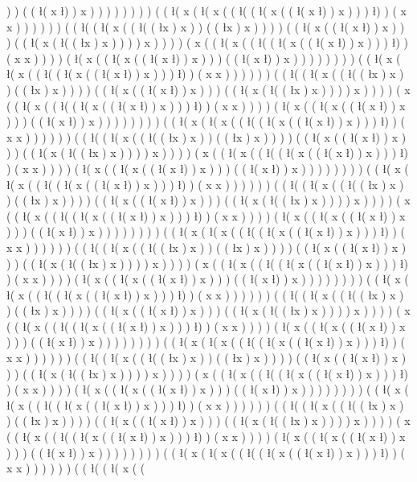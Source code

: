) ) ( ( \l ( x \l ) ) x ) ) ) ) ) ) ) ) ( ( \l ( x ( \l ( x ( ( \l ( ( \l ( x ( ( \l ( x \l ) ) x ) ) ) \l ) ) ( x x ) ) ) ) ) ) ( ( \l ( ( \l ( x ( ( \l ( ( \l x ) x ) ) ( ( \l x ) x ) ) ) ) ( ( \l ( x ( ( \l ( x \l ) ) x ) ) ) ( ( \l ( x ( \l ( ( \l x ) x ) ) ) ) x ) ) ) ) ( x ( ( \l ( x ( ( \l ( ( \l ( x ( ( \l ( x \l ) ) x ) ) ) \l ) ) ( x x ) ) ) ) ( \l ( x ( ( \l ( x ( ( \l ( x \l ) ) x ) ) ) ( ( \l ( x \l ) ) x ) ) ) ) ) ) ) ) ( ( \l ( x ( \l ( x ( ( \l ( ( \l ( x ( ( \l ( x \l ) ) x ) ) ) \l ) ) ( x x ) ) ) ) ) ) ( ( \l ( ( \l ( x ( ( \l ( ( \l x ) x ) ) ( ( \l x ) x ) ) ) ) ( ( \l ( x ( ( \l ( x \l ) ) x ) ) ) ( ( \l ( x ( \l ( ( \l x ) x ) ) ) ) x ) ) ) ) ( x ( ( \l ( x ( ( \l ( ( \l ( x ( ( \l ( x \l ) ) x ) ) ) \l ) ) ( x x ) ) ) ) ( \l ( x ( ( \l ( x ( ( \l ( x \l ) ) x ) ) ) ( ( \l ( x \l ) ) x ) ) ) ) ) ) ) ) ( ( \l ( x ( \l ( x ( ( \l ( ( \l ( x ( ( \l ( x \l ) ) x ) ) ) \l ) ) ( x x ) ) ) ) ) ) ( ( \l ( ( \l ( x ( ( \l ( ( \l x ) x ) ) ( ( \l x ) x ) ) ) ) ( ( \l ( x ( ( \l ( x \l ) ) x ) ) ) ( ( \l ( x ( \l ( ( \l x ) x ) ) ) ) x ) ) ) ) ( x ( ( \l ( x ( ( \l ( ( \l ( x ( ( \l ( x \l ) ) x ) ) ) \l ) ) ( x x ) ) ) ) ( \l ( x ( ( \l ( x ( ( \l ( x \l ) ) x ) ) ) ( ( \l ( x \l ) ) x ) ) ) ) ) ) ) ) ( ( \l ( x ( \l ( x ( ( \l ( ( \l ( x ( ( \l ( x \l ) ) x ) ) ) \l ) ) ( x x ) ) ) ) ) ) ( ( \l ( ( \l ( x ( ( \l ( ( \l x ) x ) ) ( ( \l x ) x ) ) ) ) ( ( \l ( x ( ( \l ( x \l ) ) x ) ) ) ( ( \l ( x ( \l ( ( \l x ) x ) ) ) ) x ) ) ) ) ( x ( ( \l ( x ( ( \l ( ( \l ( x ( ( \l ( x \l ) ) x ) ) ) \l ) ) ( x x ) ) ) ) ( \l ( x ( ( \l ( x ( ( \l ( x \l ) ) x ) ) ) ( ( \l ( x \l ) ) x ) ) ) ) ) ) ) ) ( ( \l ( x ( \l ( x ( ( \l ( ( \l ( x ( ( \l ( x \l ) ) x ) ) ) \l ) ) ( x x ) ) ) ) ) ) ( ( \l ( ( \l ( x ( ( \l ( ( \l x ) x ) ) ( ( \l x ) x ) ) ) ) ( ( \l ( x ( ( \l ( x \l ) ) x ) ) ) ( ( \l ( x ( \l ( ( \l x ) x ) ) ) ) x ) ) ) ) ( x ( ( \l ( x ( ( \l ( ( \l ( x ( ( \l ( x \l ) ) x ) ) ) \l ) ) ( x x ) ) ) ) ( \l ( x ( ( \l ( x ( ( \l ( x \l ) ) x ) ) ) ( ( \l ( x \l ) ) x ) ) ) ) ) ) ) ) ( ( \l ( x ( \l ( x ( ( \l ( ( \l ( x ( ( \l ( x \l ) ) x ) ) ) \l ) ) ( x x ) ) ) ) ) ) ( ( \l ( ( \l ( x ( ( \l ( ( \l x ) x ) ) ( ( \l x ) x ) ) ) ) ( ( \l ( x ( ( \l ( x \l ) ) x ) ) ) ( ( \l ( x ( \l ( ( \l x ) x ) ) ) ) x ) ) ) ) ( x ( ( \l ( x ( ( \l ( ( \l ( x ( ( \l ( x \l ) ) x ) ) ) \l ) ) ( x x ) ) ) ) ( \l ( x ( ( \l ( x ( ( \l ( x \l ) ) x ) ) ) ( ( \l ( x \l ) ) x ) ) ) ) ) ) ) ) ( ( \l ( x ( \l ( x ( ( \l ( ( \l ( x ( ( \l ( x \l ) ) x ) ) ) \l ) ) ( x x ) ) ) ) ) ) ( ( \l ( ( \l ( x ( ( \l ( ( \l x ) x ) ) ( ( \l x ) x ) ) ) ) ( ( \l ( x ( ( \l ( x \l ) ) x ) ) ) ( ( \l ( x ( \l ( ( \l x ) x ) ) ) ) x ) ) ) ) ( x ( ( \l ( x ( ( \l ( ( \l ( x ( ( \l ( x \l ) ) x ) ) ) \l ) ) ( x x ) ) ) ) ( \l ( x ( ( \l ( x ( ( \l ( x \l ) ) x ) ) ) ( ( \l ( x \l ) ) x ) ) ) ) ) ) ) ) ( ( \l ( x ( \l ( x ( ( \l ( ( \l ( x ( ( \l ( x \l ) ) x ) ) ) \l ) ) ( x x ) ) ) ) ) ) ( ( \l ( ( \l ( x ( ( \l ( ( \l x ) x ) ) ( ( \l x ) x ) ) ) ) ( ( \l ( x ( ( \l ( x \l ) ) x ) ) ) ( ( \l ( x ( \l ( ( \l x ) x ) ) ) ) x ) ) ) ) ( x ( ( \l ( x ( ( \l ( ( \l ( x ( ( \l ( x \l ) ) x ) ) ) \l ) ) ( x x ) ) ) ) ( \l ( x ( ( \l ( x ( ( \l ( x \l ) ) x ) ) ) ( ( \l ( x \l ) ) x ) ) ) ) ) ) ) ) ( ( \l ( x ( \l ( x ( ( \l ( ( \l ( x ( ( \l ( x \l ) ) x ) ) ) \l ) ) ( x x ) ) ) ) ) ) ( ( \l ( ( \l ( x ( ( 